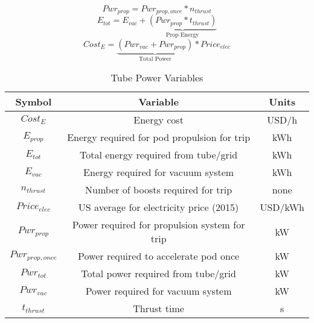 \begin{equation}
	Pwr_{prop} = Pwr_{prop,once} * n_{thrust}
\end{equation}
\begin{equation}
	E_{tot} = E_{vac} + \underbrace{(Pwr_{prop} * t_{thrust})}_\text{Prop Energy}
\end{equation}
\begin{equation}
	Cost_{E} = \underbrace{(Pwr_{vac} + Pwr_{prop})}_\text{Total Power} * Price_{elec}
\end{equation}
\begin{table}[ht]
	\caption{Tube Power Variables} %
	\centering %
	\begin{tabular}{c c c} %
		\hline\hline %
		Symbol             & Variable                                      & Units   \\ [0.5ex] %
		\hline %
		$Cost_{E}$         & Energy cost                                   & USD/h   \\
		$E_{prop}$         & Energy required for pod propulsion for trip   & kWh     \\
		$E_{tot}$          & Total energy required from tube/grid          & kWh     \\
		$E_{vac}$          & Energy required for vacuum system             & kWh     \\
		$n_{thrust}$       & Number of boosts required for trip            & none    \\
		$Price_{elec}$     & US average for electricity price (2015)       & USD/kWh \\
		$Pwr_{prop}$       & Power required for propulsion system for trip & kW      \\
		$ Pwr_{prop,once}$ & Power required to accelerate pod once         & kW      \\
		$Pwr_{tot}$        & Total power required from tube/grid           & kW      \\
		$Pwr_{vac}$        & Power required for vacuum system              & kW      \\
		$t_{thrust}$       & Thrust time                                   & s       \\
		\hline %
	\end{tabular}
	\label{tbl:tube_power_vars} %
\end{table}

